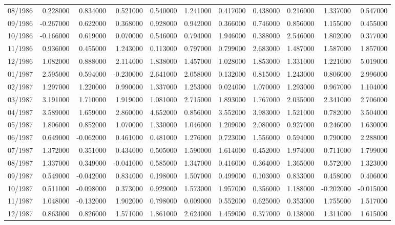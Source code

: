 \begin{tabular}{lrrrrrrrrrr}
08/1986 & 0.228000 & 0.834000 & 0.521000 & 0.540000 & 1.241000 & 0.417000 & 0.438000 & 0.216000 & 1.337000 & 0.547000 \\
09/1986 & -0.267000 & 0.622000 & 0.368000 & 0.928000 & 0.942000 & 0.366000 & 0.746000 & 0.856000 & 1.155000 & 0.455000 \\
10/1986 & -0.166000 & 0.619000 & 0.070000 & 0.546000 & 0.794000 & 1.946000 & 0.388000 & 2.546000 & 1.802000 & 0.377000 \\
11/1986 & 0.936000 & 0.455000 & 1.243000 & 0.113000 & 0.797000 & 0.799000 & 2.683000 & 1.487000 & 1.587000 & 1.857000 \\
12/1986 & 1.082000 & 0.888000 & 2.114000 & 1.838000 & 1.457000 & 1.028000 & 1.853000 & 1.331000 & 1.221000 & 5.019000 \\
01/1987 & 2.595000 & 0.594000 & -0.230000 & 2.641000 & 2.058000 & 0.132000 & 0.815000 & 1.243000 & 0.806000 & 2.996000 \\
02/1987 & 1.297000 & 1.220000 & 0.990000 & 1.337000 & 1.253000 & 0.024000 & 1.070000 & 1.293000 & 0.967000 & 1.104000 \\
03/1987 & 3.191000 & 1.710000 & 1.919000 & 1.081000 & 2.715000 & 1.893000 & 1.767000 & 2.035000 & 2.341000 & 2.706000 \\
04/1987 & 3.589000 & 1.659000 & 2.860000 & 4.652000 & 0.856000 & 3.552000 & 3.983000 & 1.521000 & 0.782000 & 3.504000 \\
05/1987 & 1.806000 & 0.852000 & 1.070000 & 1.330000 & 1.046000 & 1.209000 & 2.080000 & 0.927000 & 0.246000 & 1.630000 \\
06/1987 & 0.649000 & -0.062000 & 0.461000 & 0.481000 & 1.276000 & 0.723000 & 1.556000 & 0.594000 & 0.790000 & 2.288000 \\
07/1987 & 1.372000 & 0.351000 & 0.434000 & 0.505000 & 1.590000 & 1.614000 & 0.452000 & 1.974000 & 0.711000 & 1.799000 \\
08/1987 & 1.337000 & 0.349000 & -0.041000 & 0.585000 & 1.347000 & 0.416000 & 0.364000 & 1.365000 & 0.572000 & 1.323000 \\
09/1987 & 0.549000 & -0.042000 & 0.834000 & 0.198000 & 1.507000 & 0.499000 & 0.103000 & 0.833000 & 0.458000 & 0.406000 \\
10/1987 & 0.511000 & -0.098000 & 0.373000 & 0.929000 & 1.573000 & 1.957000 & 0.356000 & 1.188000 & -0.202000 & -0.015000 \\
11/1987 & 1.048000 & -0.132000 & 1.902000 & 0.798000 & 0.009000 & 0.552000 & 0.625000 & 0.353000 & 1.755000 & 1.517000 \\
12/1987 & 0.863000 & 0.826000 & 1.571000 & 1.861000 & 2.624000 & 1.459000 & 0.377000 & 0.138000 & 1.311000 & 1.615000 \\

\end{tabular}
